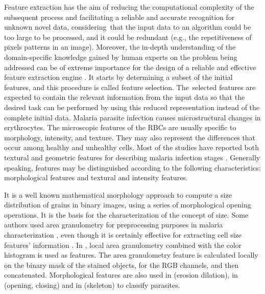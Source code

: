 {	%
	
	Feature extraction has the aim of reducing the computational complexity of the subsequent process and facilitating a reliable and accurate recognition for unknown novel data, considering~that the input data to an algorithm could be too large to be processed, and it could be redundant (e.g., the repetitiveness of pixels patterns in an image). Moreover, the in-depth understanding of the domain-specific knowledge gained by human experts on the problem being addressed can be of extreme importance for the design of a reliable and effective feature extraction engine \cite{Jiang2009}.
	It starts by determining a subset of the initial features, and this procedure is called feature selection. The~selected features are expected to contain the relevant information from the input data so that the desired task can be performed by using this reduced representation instead of the complete initial data.
	Malaria parasite infection causes microstructural changes in erythrocytes. The microscopic features of the RBCs are usually specific to morphology, intensity, and texture. They may also represent the differences that occur among healthy and unhealthy cells. Most of the studies have reported both textural and geometric features for describing malaria infection stages \cite{Das2015}.
	Generally speaking, features may be distinguished according to the following characteristics: morphological features and textural and intensity features.
	
	It is a well known mathematical morphology approach to compute a size distribution of grains in binary images, using a series of morphological opening operations. It is the basis for the characterization of the concept of size. Some authors used area granulometry for preprocessing purposes in malaria characterization \cite{Tek2010}, even though it is certainly effective for extracting cell size features' information \cite{Springl2009, Tek2006, Malihi2013}. In \cite{Tek2010}, local area granulometry combined with the color histogram is used as features. The area granulometry feature is calculated locally on the binary mask of the stained objects, for the RGB channels, and then concatenated. Morphological features are also used in \cite{Ross2006} (erosion dilation), in \cite{Das2011} (opening, closing) and in \cite{DiRuberto2002} (skeleton) to classify parasites.
	
}
